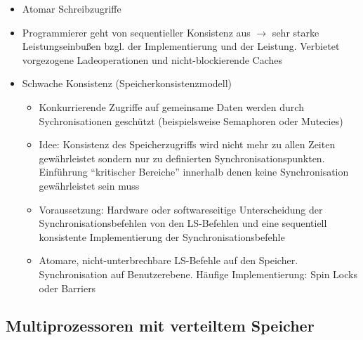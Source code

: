 \begin{itemize}
\begin{itemize}
		\item Atomar Schreibzugriffe
		\item Programmierer geht von sequentieller Konsistenz aus \(\rightarrow\) sehr starke Leistungseinbußen bzgl. der Implementierung und der Leistung. Verbietet vorgezogene Ladeoperationen und nicht-blockierende Caches
		\item Schwache Konsistenz (Speicherkonsistenzmodell)
		\begin{itemize}
			\item Konkurrierende Zugriffe auf gemeinsame Daten werden durch Sychronisationen geschützt (beispielsweise Semaphoren oder Mutecies)
			\item Idee: Konsistenz des Speicherzugriffs wird nicht mehr zu allen Zeiten gewährleistet sondern nur zu definierten Synchronisationspunkten. Einführung "`kritischer Bereiche"' innerhalb denen keine Synchronisation gewährleistet sein muss
			\item Voraussetzung: Hardware oder softwareseitige Unterscheidung der Synchronisationsbefehlen von den LS-Befehlen und eine sequentiell konsistente Implementierung der Synchronisationsbefehle
			\item Atomare, nicht-unterbrechbare LS-Befehle auf den Speicher. Synchronisation auf Benutzerebene. Häufige Implementierung: Spin Locks oder Barriers
		\end{itemize}
	\end{itemize}
\end{itemize}


\subsection{Multiprozessoren mit verteiltem Speicher}

